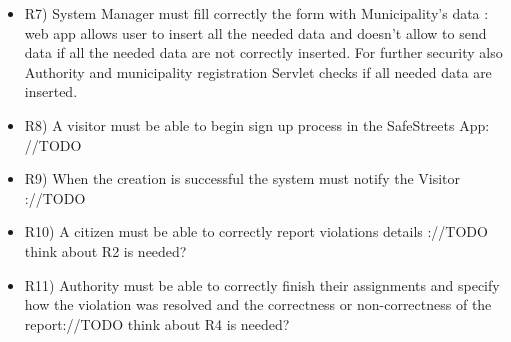 \begin{itemize}
\item R7) System Manager must fill correctly the form with Municipality’s data : web app allows user to insert all the needed data and doesn't allow to send data if all the needed data are not correctly inserted. For further security also Authority and municipality registration Servlet checks if all needed data are inserted.
 \item R8) A visitor must be able to begin sign up process in the SafeStreets App: //TODO
 \item R9) When the creation is successful the system must notify the Visitor  ://TODO
 \item R10) A citizen must be able to correctly report violations details ://TODO think about R2 is needed?
 \item R11) Authority must be able to correctly finish their assignments and specify how the violation was resolved and the correctness or non-correctness of the report://TODO think about R4 is needed?
\end{itemize}

